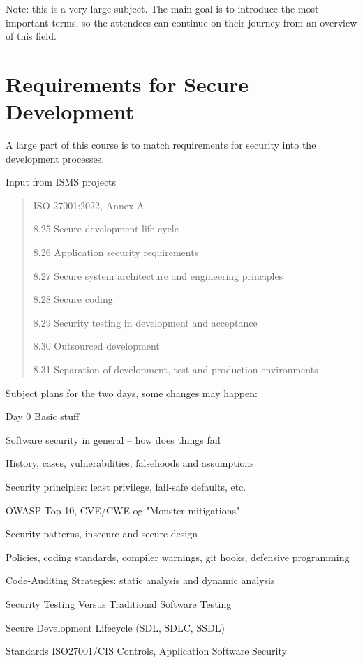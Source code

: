 \documentclass[a4paper,11pt,notitlepage]{report}
\begin{document}
Note: this is a very large subject. The main goal is to introduce the most important terms, so the attendees can continue on their journey from an overview of this field.

\section*{Requirements for Secure Development}

A large part of this course is to match requirements for security into the development processes.

Input from ISMS projects

\begin{quote}
ISO 27001:2022, Annex A
\begin{list2}
\item 8.25 Secure development life cycle
\item 8.26 Application security requirements
\item 8.27 Secure system architecture and engineering principles
\item 8.28 Secure coding
\item 8.29 Security testing in development and acceptance
\item 8.30 Outsourced development
\item 8.31 Separation of development, test and production environments
\end{list2}

\end{quote}

Subject plans for the two days, some changes may happen:

Day 0 Basic stuff
\begin{list2}
\item Software security in general – how does things fail
\item History, cases, vulnerabilities, falsehoods and assumptions
\item Security principles: least privilege, fail-safe defaults, etc.
\item OWASP Top 10, CVE/CWE og "Monster mitigations"
\item Security patterns, insecure and secure design
\item Policies, coding standards, compiler warnings, git hooks, defensive programming
\item Code-Auditing Strategies: static analysis and dynamic analysis
\item Security Testing Versus Traditional Software Testing
\item Secure Development Lifecycle (SDL, SDLC, SSDL)
\item Standards ISO27001/CIS Controls, Application Software Security
\end{list2}
\end{document}
